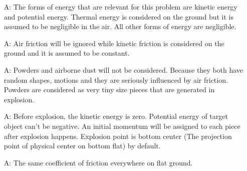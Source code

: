 \documentclass[12pt]{article}
\newcounter{assumpnum} %
\begin{document}
	\begin{itemize}
		
		\item[A\refstepcounter{assumpnum}\theassumpnum \label{A_mechanical}:]
		The forms of energy that are relevant for this problem are kinetic energy and potential energy. Thermal energy is considered on the ground but it is assumed to be negligible in the air. All other forms of energy are negligible. 
		
		\item[A\refstepcounter{assumpnum}\theassumpnum \label{A_airFriction}:]
		Air friction will be ignored while kinetic friction is considered on the ground and it is assumed to be constant.
		
		\item[A\refstepcounter{assumpnum}\theassumpnum \label{A_powder}:]
		Powders and airborne  dust will not be considered. Because they both have random shapes, motions and they are seriously influenced by air friction. Powders are considered as very tiny size pieces that are generated in explosion.
		 
		
		\item[A\refstepcounter{assumpnum}\theassumpnum \label{A_initialPE}:]
	Before explosion, the kinetic energy is zero. Potential energy of target object can't be negative. An initial momentum will be assigned to each piece after explosion happens. Explosion point is bottom center (The projection point of physical center on bottom flat) by default. 
		
		\item[A\refstepcounter{assumpnum}\theassumpnum \label{A_ground}:]
		The same coefficient of friction everywhere on flat ground.​
		

\end{itemize}
\end{document}
